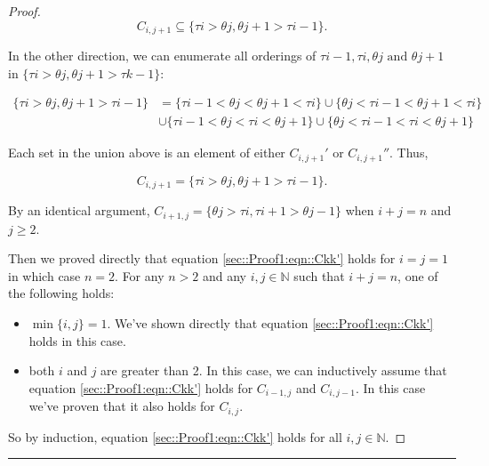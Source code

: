\documentclass[12pt]{article}
\newcommand{\mb}{\mathbb}
\newcommand{\te}{\text}
\newcommand{\lin}{\rule{\linewidth}{0.4 pt}}
\newcommand{\rt}{\tau}							%
\newcommand{\rtt}{\theta}						%
\renewcommand{\it}{k}							%
\newcommand{\pathsete}[2]{C_{#1,#2}}			%
\begin{document}
\begin{proof}
\[\pathsete{i}{j+1} \subseteq \{\rt{i} > \rtt{j},\rtt{j+1} > \rt{i-1}\}.\]

In the other direction, we can enumerate all orderings of \(\rt{i-1},\rt{i},\rtt{j}\te{ and } \rtt{j+1}\) in \(\{\rt{i} > \rtt{j}, \rtt{j+1} > \rt{\it-1}\}\):

\begin{align*}
\{\rt{i} > \rtt{j},\rtt{j+1} > \rt{i-1}\} &= \{\rt{i-1} < \rtt{j} < \rtt{j+1} < \rt{i}\} \cup \{\rtt{j} < \rt{i-1} < \rtt{j+1} < \rt{i}\}\\
&\cup \{\rt{i-1} < \rtt{j} < \rt{i} < \rtt{j+1}\} \cup \{\rtt{j} < \rt{i-1} <\rt{i} < \rtt{j+1}\}
\end{align*}

Each set in the union above is an element of either \(\pathsete{i}{j+1}'\) or \(\pathsete{i}{j+1}''\). Thus,

\[\pathsete{i}{j+1} = \{\rt{i} > \rtt{j},\rtt{j+1} > \rt{i-1}\}.\]

By an identical argument, \(\pathsete{i+1}{j} = \{\rtt{j} > \rt{i},\rt{i+1} > \rtt{j-1}\}\) when \(i + j = n\) and \(j \geq 2\).

Then we proved directly that equation \eqref{sec::Proof1:eqn::Ckk'} holds for \(i = j=1\) in which case \(n = 2\). For any \(n > 2\) and any \(i,j\in \mb{N}\) such that \(i + j = n\), one of the following holds:

\begin{itemize}
\item \(\min\{i,j\} = 1\). We've shown directly that equation \eqref{sec::Proof1:eqn::Ckk'} holds in this case.

\item both \(i\) and \(j\) are greater than 2. In this case, we can inductively assume that equation \eqref{sec::Proof1:eqn::Ckk'} holds for \(\pathsete{i-1}{j}\) and \(\pathsete{i}{j-1}\). In this case we've proven that it also holds for \(\pathsete{i}{j}\).
\end{itemize}

So by induction, equation \eqref{sec::Proof1:eqn::Ckk'} holds for all \(i,j\in \mb{N}\).
\end{proof}

\lin
\end{document}
